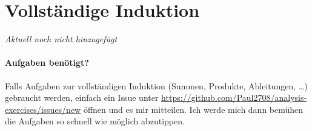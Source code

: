 \section{Vollständige Induktion}

\textit{Aktuell noch nicht hinzugefügt}

\paragraph{Aufgaben benötigt?}
Falls Aufgaben zur vollständigen Induktion (Summen, Produkte, Ableitungen, \dots) gebraucht werden, einfach ein Issue unter \url{https://github.com/Paul2708/analysis-exercises/issues/new} öffnen und es mir mitteilen.
Ich werde mich dann bemühen die Aufgaben so schnell wie möglich abzutippen.